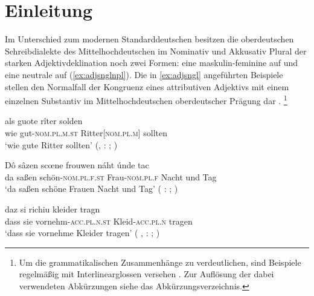 \chapter{Einleitung}
\label{ch:einleitung}

Im Unterschied zum modernen Standarddeutschen besitzen die oberdeutschen
Schreib\-dialekte des Mittelhochdeutschen im Nominativ und Akkusativ Plural der
starken Adjektivdeklination noch zwei Formen: eine maskulin-feminine auf
  und eine neutrale auf
 (\ref{ex:adjsnglnpl}). Die in \cref{ex:adjsngl} angeführten
Beispiele stellen den Normalfall der Kongruenz eines attributiven Adjektivs mit
einem einzelnen Substantiv im Mittelhochdeutschen oberdeutscher Prägung dar
\autocites[vgl.][181--184]{ksw2}[200--203]{paul2007}.%
%
	\footnote{Um die grammatikalischen Zusammenhänge zu verdeutlichen, sind
		Beispiele regelmäßig mit Interlinear\-glossen versehen
		\autocite[vgl.][]{lgr}. Zur Auflösung der dabei verwendeten Abkürzungen
		siehe das Abkürzungsverzeichnis.}

\begin{exe}
\ex \label{ex:adjsngl}
	\begin{xlist}
	\ex \label{ex:adjsnglmpl}
		\gll als guote rîter solden \\
			wie gut-\textsc{nom.pl.m.st} Ritter[\textsc{nom.pl.m}] sollten \\
	\trans `wie gute Ritter sollten'
		(, : ;
			\cite[606]{mertens2004}%
		)

	\ex \label{ex:adjsnglfpl}
		\gll Dô sâzen scœne frouwen náht únde tac \\
			da saßen schön-\textsc{nom.pl.f.st} Frau-\textsc{nom.pl.f} Nacht 
			und	Tag \\
	\trans `da saßen schöne Frauen Nacht und Tag'
		(%
			: ;
			\cite[16]{deboor1988}%
		)

	\ex \label{ex:adjsnglnpl}
		\gll daz si richiu kleider tragn \\
			dass sie vornehm-\textsc{acc.pl.n.st} Kleid-\textsc{acc.pl.n}
			tragen \\
		\trans `dass sie vornehme Kleider tragen'
			(%
				, : ;
				\cite[24]{knechtschirok2003}%
			)
\end{xlist}
\end{exe}

